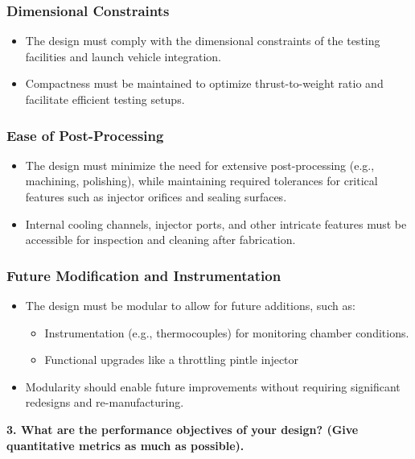 \subsubsection{Dimensional Constraints}
\begin{itemize}
    \item The design must comply with the dimensional constraints of the testing facilities and launch vehicle integration.
    \item Compactness must be maintained to optimize thrust-to-weight ratio and facilitate efficient testing setups.
\end{itemize}

\subsubsection{Ease of Post-Processing}
\begin{itemize}
    \item The design must minimize the need for extensive post-processing (e.g., machining, polishing), while maintaining required tolerances for critical features such as injector orifices and sealing surfaces.
    \item Internal cooling channels, injector ports, and other intricate features must be accessible for inspection and cleaning after fabrication.
\end{itemize}

\subsubsection{Future Modification and Instrumentation}
\begin{itemize}
    \item The design must be modular to allow for future additions, such as:
    \begin{itemize}
        \item Instrumentation (e.g., thermocouples) for monitoring chamber conditions.
        \item Functional upgrades like a throttling pintle injector
    \end{itemize}
    \item Modularity should enable future improvements without requiring significant redesigns and re-manufacturing.
\end{itemize}


\textbf{3. What are the performance objectives of your design? (Give quantitative metrics as much as possible).}

